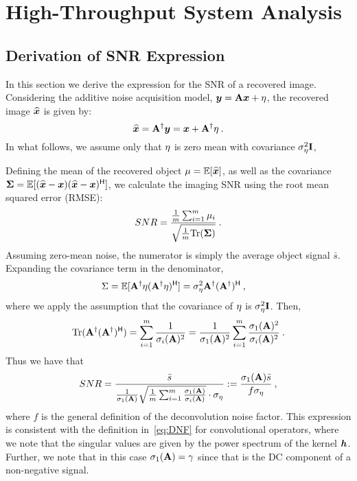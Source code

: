 \section{High-Throughput System Analysis}
\label{sec:appendix:hightroughput}
\subsection{Derivation of SNR Expression}

\label{sec:appendix:snr_derivation}

In this section we derive the expression for the SNR of a recovered image. Considering the additive noise acquisition model, $\bm{y} = \mathbf{A}\bm{x} + {\eta}$,
the recovered image $\widehat {\bm{x}}$ is given by:
\[\widehat {\bm{x}} =  \mathbf{A}^\dagger  \bm{y} = \bm{x} +  \mathbf{A}^\dagger  {\eta}\:.\]
In what follows, we assume only that ${\eta}$ is zero mean with covariance $\sigma_{\eta}^2 \mathbf{I}$,

Defining the mean of the recovered object $\mu = \mathbb{E}[\widehat {\bm{x}}]$, as well as the covariance $\mathbf\Sigma = \mathbb{E}[(\widehat {\bm{x}}-\bm{x}) (\widehat {\bm{x}}-\bm{x})^{\mathsf{H}}]$, we calculate the imaging SNR using the root mean squared error (RMSE):
\[SNR = \frac{\frac{1}{m}\sum_{i=1}^m\mu_i}{\sqrt{\frac{1}{m}\mathrm{Tr}(\mathbf\Sigma)}}\:.\]
Assuming zero-mean noise, the numerator is simply the average object signal $\bar s$.
Expanding the covariance term in the denominator,
\begin{align*}
    \Sigma &= \mathbb{E}[ \mathbf{A}^\dagger  {\eta}( \mathbf{A}^\dagger  {\eta})^{\mathsf{H}}]
    = \sigma_{ {\eta}}^2  \mathbf{A}^\dagger ( \mathbf{A}^\dagger)^{\mathsf{H}}\:,
\end{align*}
where we apply the assumption that the covariance of ${\eta}$ is $\sigma_{\eta}^2 \mathbf{I}$. Then,
\[\mathrm{Tr}( \mathbf{A}^\dagger ( \mathbf{A}^\dagger)^{\mathsf{H}} ) = \sum_{i=1}^m \frac{1}{\sigma_i( \mathbf{A})^2} = \frac{1}{\sigma_1(\mathbf{A})^2} \sum_{i=1}^m \frac{\sigma_1(\mathbf{A})^2}{\sigma_i(\mathbf{A})^2} \:.\]
Thus we have that
\[SNR = \frac{\bar s}{\frac{1}{\sigma_1(\mathbf{A})} \sqrt{\frac{1}{m}\sum_{i=1}^m \frac{\sigma_1(\mathbf{A})}{\sigma_i(\mathbf{A})}} \cdot\sigma_\eta} := \frac{\sigma_1(\mathbf{A}) \bar s }{ f\sigma_\eta }\:,\]
where $f$ is the general definition of the deconvolution noise factor. This expression is consistent with the definition in~\eqref{eq:DNF} for convolutional operators, where we note that the singular values are given by the power spectrum of the kernel $\bm{h}$. Further, we note that in this case $\sigma_1(\mathbf{A})=\gamma$ since that is the DC component of a non-negative signal.

